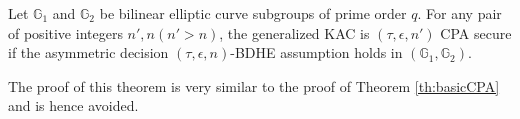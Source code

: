 \begin{Theorem}
\label{th:twotierCPA}
Let $\mathbb{G}_1$ and $\mathbb{G}_2$ be bilinear elliptic curve subgroups of prime order $q$. For any pair of positive integers $n',n (n'>n)$, the generalized KAC is $(\tau,\epsilon,n')$ CPA secure if the asymmetric decision $(\tau,\epsilon,n)$-BDHE assumption holds in $(\mathbb{G}_1,\mathbb{G}_2)$.
\end{Theorem}

\noindent The proof of this theorem is very similar to the proof of Theorem \ref{th:basicCPA} and is hence avoided.

% 
% 
